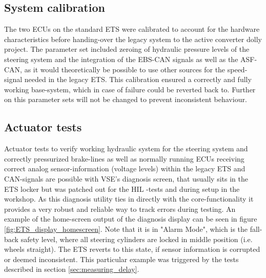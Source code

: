 \documentclass[ExampleMasters.tex]{subfiles}
\begin{document}
\subsection{System calibration}

The two \gls{ECU}s on the standard \gls{ETS} were calibrated to account for the hardware characteristics before handing-over the legacy system to the active converter dolly project. The parameter set included zeroing of hydraulic pressure levels of the steering system and the integration of the \gls{EBS}-\gls{CAN} signals as well as the \gls{ASF}-\gls{CAN}, as it would theoretically be possible to use other sources for the speed-signal needed in the legacy \gls{ETS}. This calibration ensured a correctly and fully working base-system, which in case of failure could be reverted back to. Further on this parameter sets will not be changed to prevent inconsistent behaviour. 

\subsection{Actuator tests}

Actuator tests to verify working hydraulic system for the steering system and correctly pressurized brake-lines as well as normally running \gls{ECU}s receiving correct analog sensor-information (voltage levels) within the legacy \gls{ETS} and \gls{CAN}-signals are possible with \gls{VSE}'s diagnosis screen, that usually sits in the \gls{ETS} locker but was patched out for the \gls{HIL} -tests and during setup in the workshop. As this diagnosis utility ties in directly with the core-functionality it provides a very robust and reliable way to track errors during testing. An example of the home-screen output of the diagnosis display can be seen in figure \ref{fig:ETS_display_homescreen}. Note that it is in "Alarm Mode", which is the fall-back safety level, where all steering cylinders are locked in middle position (i.e. wheels straight). The \gls{ETS} reverts to this state, if sensor information is corrupted or deemed inconsistent. This particular example was triggered by the tests described in section \ref{sec:measuring_delay}.
\end{document}
